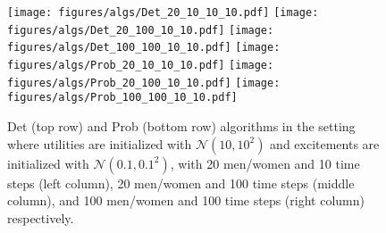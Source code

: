 \begin{figure}
    \centering
    \texttt{[image: figures/algs/Det\_20\_10\_10\_10.pdf]}
    \texttt{[image: figures/algs/Det\_20\_100\_10\_10.pdf]}
    \texttt{[image: figures/algs/Det\_100\_100\_10\_10.pdf]}
    \texttt{[image: figures/algs/Prob\_20\_10\_10\_10.pdf]}
    \texttt{[image: figures/algs/Prob\_20\_100\_10\_10.pdf]}
    \texttt{[image: figures/algs/Prob\_100\_100\_10\_10.pdf]}
    \caption{Det (top row) and Prob (bottom row) algorithms in the setting where utilities are initialized with $\mathcal{N}(10, 10^2)$ and excitements are initialized with $\mathcal{N}(0.1, 0.1^2)$, with 20 men/women and 10 time steps (left column), 20 men/women and 100 time steps (middle column), and 100 men/women and 100 time steps (right column) respectively.}
    \label{fig:algs}
\end{figure}